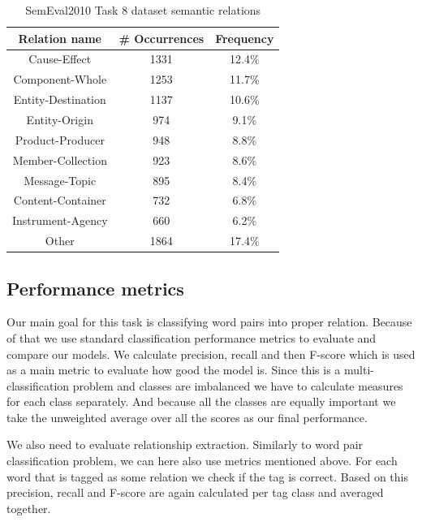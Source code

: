 \documentclass[fleqn,moreauthors,10pt]{ds_report}
\begin{document}
\begin{table}[h]
    \centering
    \begin{tabular}{|c|c|c|}
    \hline
        \textbf{Relation name} & \textbf{\# Occurrences} & \textbf{Frequency} \\ \hline \hline
        Cause-Effect & 1331 & 12.4\% \\ \hline
        Component-Whole & 1253 & 11.7\% \\ \hline
        Entity-Destination & 1137 & 10.6\% \\ \hline
        Entity-Origin & 974 & 9.1\% \\ \hline
        Product-Producer & 948 & 8.8\% \\ \hline
        Member-Collection & 923 & 8.6\% \\ \hline
        Message-Topic & 895 & 8.4\% \\ \hline
        Content-Container & 732 & 6.8\% \\ \hline
        Instrument-Agency & 660 & 6.2\% \\ \hline
        Other & 1864 & 17.4\% \\ \hline
    \end{tabular}
    \caption{SemEval2010 Task 8 dataset semantic relations}
    \label{tab:semeval}
\end{table}


\subsection{Performance metrics}
\par Our main goal for this task is classifying word pairs into proper relation. Because of that we use standard classification performance metrics to evaluate and compare our models. We calculate precision, recall and then F-score which is used as a main metric to evaluate how good the model is. Since this is a multi-classification problem and classes are imbalanced we have to calculate measures for each class separately. And because all the classes are equally important we take the unweighted average over all the scores as our final performance. 
\par We also need to evaluate relationship extraction. Similarly to word pair classification problem, we can here also use metrics mentioned above. For each word that is tagged as some relation we check if the tag is correct. Based on this precision, recall and F-score are again calculated per tag class and averaged together. 
\end{document}
